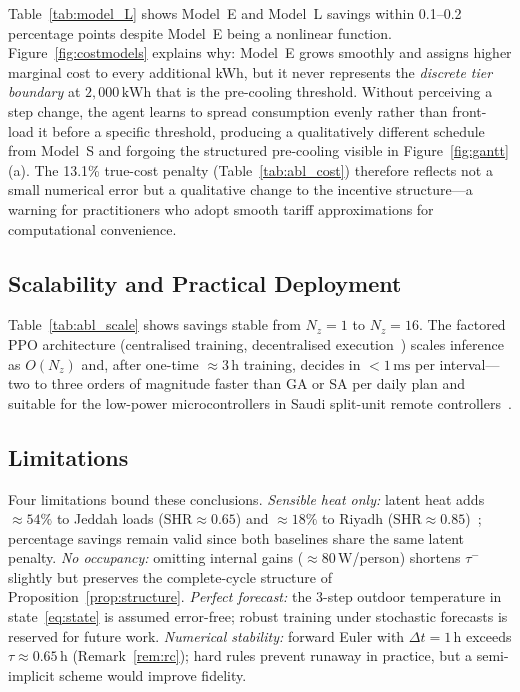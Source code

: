\documentclass[12pt,a4paper]{article}
\let\oldsubsection\subsection
\renewcommand{\subsection}[1]{\FloatBarrier\oldsubsection{#1}}
\newcommand{\kWh}{\text{kWh}}
\newcommand{\taum}{\tau^{-}}
\begin{document}
Table~\ref{tab:model_L} shows Model~E and Model~L savings within 0.1--0.2
percentage points despite Model~E being a nonlinear function.
Figure~\ref{fig:costmodels} explains why: Model~E grows smoothly and
assigns higher marginal cost to every additional kWh, but it never
represents the \emph{discrete tier boundary} at $2{,}000\,\kWh$ that
is the pre-cooling threshold.
Without perceiving a step change, the agent learns to spread consumption
evenly rather than front-load it before a specific threshold, producing
a qualitatively different schedule from Model~S and forgoing the
structured pre-cooling visible in Figure~\ref{fig:gantt}(a).
The 13.1\% true-cost penalty (Table~\ref{tab:abl_cost}) therefore
reflects not a small numerical error but a qualitative change to the
incentive structure---a warning for practitioners who adopt smooth tariff
approximations for computational convenience.

\subsection{Scalability and Practical Deployment}
\label{subsec:disc_scale}

Table~\ref{tab:abl_scale} shows savings stable from $N_z{=}1$ to
$N_z{=}16$.
The factored PPO architecture (centralised training, decentralised
execution~\cite{Yu2021}) scales inference as $O(N_z)$ and, after
one-time ${\approx}3\,\text{h}$ training, decides in ${<}1\,\text{ms}$
per interval---two to three orders of magnitude faster than GA or SA
per daily plan and suitable for the low-power microcontrollers
in Saudi split-unit remote controllers~\cite{Alotaibi2024}.

\subsection{Limitations}
\label{subsec:disc_limits}

Four limitations bound these conclusions.
\emph{Sensible heat only:} latent heat adds ${\approx}54\%$ to Jeddah
loads ($\mathrm{SHR}{\approx}0.65$) and ${\approx}18\%$ to Riyadh
($\mathrm{SHR}{\approx}0.85$)~\cite{Rodrigues2025}; percentage savings
remain valid since both baselines share the same latent penalty.
\emph{No occupancy:} omitting internal gains (${\approx}80\,\text{W}$/person)
shortens $\taum$ slightly but preserves the complete-cycle structure
of Proposition~\ref{prop:structure}.
\emph{Perfect forecast:} the 3-step outdoor temperature in
state~\eqref{eq:state} is assumed error-free; robust training under
stochastic forecasts is reserved for future work.
\emph{Numerical stability:} forward Euler with $\Delta t{=}1\,\text{h}$
exceeds $\tau{\approx}0.65\,\text{h}$ (Remark~\ref{rem:rc}); hard rules
prevent runaway in practice, but a semi-implicit scheme would improve
fidelity.
\end{document}

